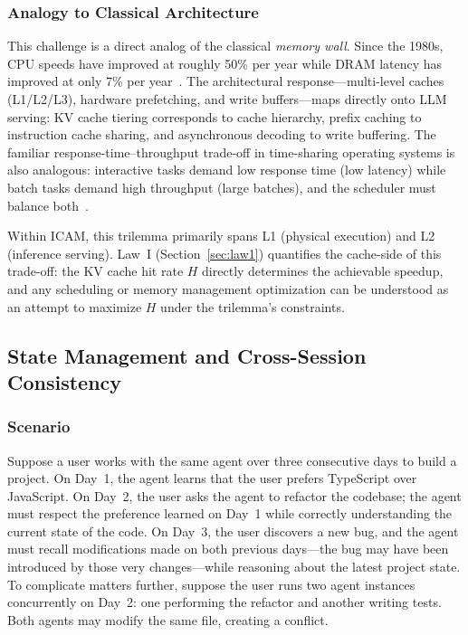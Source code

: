 \documentclass[11pt,a4paper]{article}
\begin{document}
\subsubsection{Analogy to Classical Architecture}
This challenge is a direct analog of the classical \emph{memory wall}.
Since the 1980s, CPU speeds have improved at roughly 50\% per year while DRAM latency has improved at only 7\% per year~\cite{hennessy2017quantitative}.
The architectural response---multi-level caches (L1/L2/L3), hardware prefetching, and write buffers---maps directly onto LLM serving: KV cache tiering corresponds to cache hierarchy, prefix caching to instruction cache sharing, and asynchronous decoding to write buffering.
The familiar response-time--throughput trade-off in time-sharing operating systems is also analogous: interactive tasks demand low response time (low latency) while batch tasks demand high throughput (large batches), and the scheduler must balance both~\cite{ostep_2023}.

Within ICAM, this trilemma primarily spans L1 (physical execution) and L2 (inference serving).
Law~I (Section~\ref{sec:law1}) quantifies the cache-side of this trade-off: the KV cache hit rate $H$ directly determines the achievable speedup, and any scheduling or memory management optimization can be understood as an attempt to maximize $H$ under the trilemma's constraints.


\subsection{State Management and Cross-Session Consistency}

\subsubsection{Scenario}
Suppose a user works with the same agent over three consecutive days to build a project.
On Day~1, the agent learns that the user prefers TypeScript over JavaScript.
On Day~2, the user asks the agent to refactor the codebase; the agent must respect the preference learned on Day~1 while correctly understanding the current state of the code.
On Day~3, the user discovers a new bug, and the agent must recall modifications made on both previous days---the bug may have been introduced by those very changes---while reasoning about the latest project state.
To complicate matters further, suppose the user runs two agent instances concurrently on Day~2: one performing the refactor and another writing tests.
Both agents may modify the same file, creating a conflict.
\end{document}

